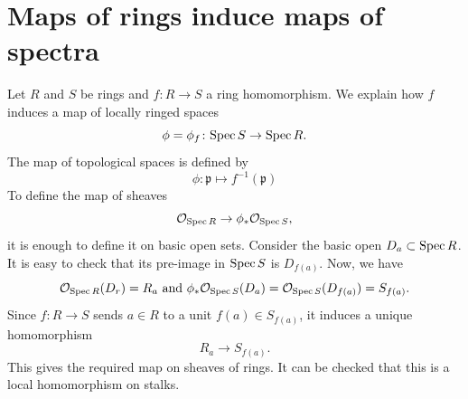 \documentclass[a4,12pt]{article}
\theoremstyle{definition}
\theoremstyle{remark}
\theoremstyle{plain}
\numberwithin{equation}{section}
\newcommand{\Spec}{\textnormal{Spec}\,}
\newcommand{\2}[4]{\begin{bmatrix}#1 & #2 \\ #3 & #4 \end{bmatrix}} %
\newcommand{\3}[9]{\begin{bmatrix}#1 & #2 & #3 \\ #4 & #5 & #6 \\ #7 & #8 & #9 \end{bmatrix}} %
\begin{document}
\section{Maps of rings induce maps of spectra}
Let \(R\) and \(S\) be rings and \(f \colon R \to S\) a ring homomorphism.
We explain how \(f\) induces a map of locally ringed spaces
\[ \phi = \phi_{f} \colon \Spec S \to \Spec R.\] 
The map of topological spaces is defined by
\begin{equation}
 \phi \colon \mathfrak{p} \mapsto f^{-1}(\mathfrak{p})
\end{equation}
To define the map of sheaves
\[ \mathcal{O}_{\Spec R} \to \phi_{*} \mathcal{O}_{\Spec S},\]
it is enough to define it on basic open sets.
Consider the basic open \(D_a \subset \Spec R\).
It is easy to check that its pre-image in \(\Spec S\) is \(D_{f(a)}\).
Now, we have
\[ \mathcal{O}_{\Spec R} (D_{r}) = R_a \text{ and } \phi_{*} \mathcal{O}_{\Spec S} (D_a) =  \mathcal{O}_{\Spec S}(D_{f(a)}) = S_{f(a)}.\]
Since \(f \colon R \to S\) sends \(a \in R\) to a unit \(f(a) \in S_{f(a)}\), it induces a unique homomorphism
\[ R_a \to S_{f(a)}.\]
This gives the required map on sheaves of rings.
It can be checked that this is a local homomorphism on stalks.
\end{document}
